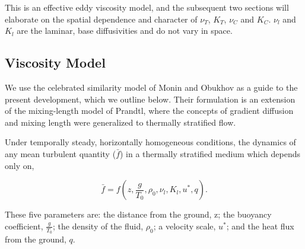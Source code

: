 This is an effective eddy viscosity model, and the subsequent two
sections will elaborate on the spatial dependence and character of
$\nu_T$, $K_T$, $\nu_C$ and $K_C$. $\nu_l$ and $K_l$ are the laminar,
base diffusivities and do not vary in space. 

\subsection{Viscosity Model}

We use the celebrated similarity model of Monin and
Obukhov\cite{monin2007statistical,monin1954basic} as a guide to the
present development, which we outline below. Their formulation is an
extension of the mixing-length model of Prandtl, where the concepts of
gradient diffusion and mixing length were generalized to thermally
stratified flow.   

%
%

Under temporally steady, horizontally homogeneous conditions, the 
dynamics of any mean turbulent quantity ($\bar f$) in a 
thermally stratified medium which depends only on,  

\begin{equation}
\bar f = f(z,\frac{g}{T_0},\rho_0,\nu_l,K_l,u^*,q).
\end{equation}

These five parameters are: the distance from the ground, z; the
buoyancy coefficient, $\frac{g}{T_0}$; the density of the fluid,
$\rho_0$; a velocity scale, $u^*$; and the heat flux from the ground,
$q$. 


